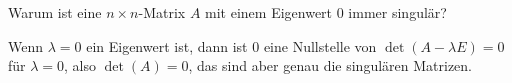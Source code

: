 Warum ist eine $n\times n$-Matrix $A$ mit einem Eigenwert 0
immer singulär?


\begin{loesung}
Wenn $\lambda=0$ ein Eigenwert ist, dann ist $0$ eine Nullstelle
von $\det(A-\lambda E)=0$ für $\lambda=0$, also $\det(A)=0$,
das sind aber genau die singulären Matrizen.
\end{loesung}

